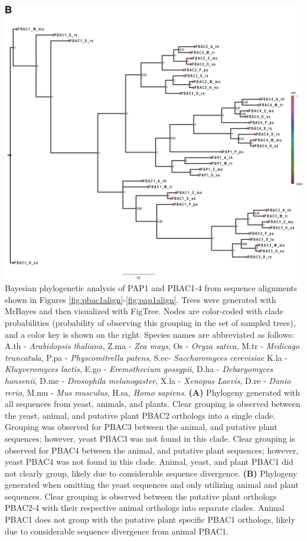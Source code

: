\begin{FPfigure}
	\ContinuedFloat
	\centering
	\includegraphics[width=\columnwidth]{Proteasome/tree2.png}
	{Bayesian phylogenetic analysis of PAP1 and PBAC1-4 from sequence alignments shown in Figures \ref{fig:pbac1align}-\ref{fig:pap1align}. Trees were generated with MrBayes \citep{ronquist12} and then visualized with FigTree. Nodes are color-coded with clade probabilities (probability of observing this grouping in the set of sampled trees), and a color key is shown on the right. Species names are abbreviated as follows: A.th - \textit{Arabidopsis thaliana}, Z.ma - \textit{Zea mays}, Os - \textit{Oryza sativa}, M.tr - \textit{Medicago truncatula}, P.pa - \textit{Physcomitrella patens}, S.ec- \textit{Saccharomyces cerevisiae} K.la - \textit{Kluyveromyces lactis}, E.go - \textit{Eremothecium gossypii}, D.ha - \textit{Debaryomyces hansenii}, D.me - \textit{Drosophila melanogaster}, X.la - \textit{Xenopus Laevis}, D.re - \textit{Danio rerio}, M.mu - \textit{Mus musculus}, H.sa, \textit{Homo sapiens}. \textbf{(A)} Phylogeny generated with all sequences from yeast, animals, and plants. Clear grouping is observed between the yeast, animal, and putative plant PBAC2 orthologs into a single clade. Grouping was observed for PBAC3 between the animal, and putative plant sequences; however, yeast PBAC3 was not found in this clade. Clear grouping is observed for PBAC4 between the animal, and putative plant sequences; however, yeast PBAC4 was not found in this clade. Animal, yeast, and plant PBAC1 did not clearly group, likely due to considerable sequence divergence. \textbf{(B)} Phylogeny generated when omitting the yeast sequences and only utilizing animal and plant sequences. Clear grouping is observed between the putative plant orthologs PBAC2-4 with their respective animal orthologs into separate clades. Animal PBAC1 does not group with the putative plant specific PBAC1 orthologs, likely due to considerable sequence divergence from animal PBAC1.}
	\label{fig:tree2}
\end{FPfigure}
\FloatBarrier


